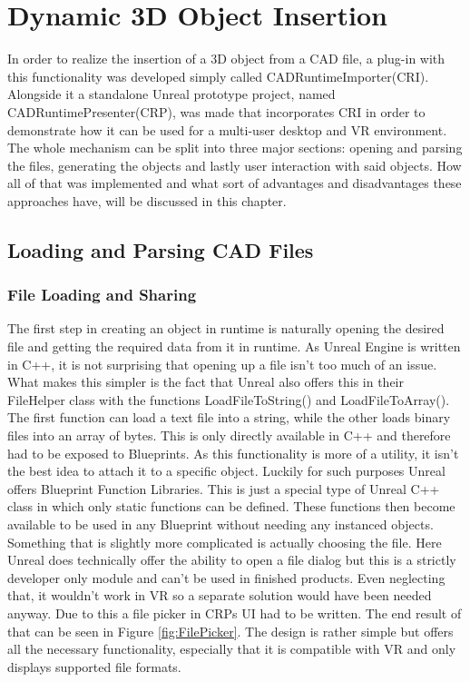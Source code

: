 \chapter{Dynamic 3D Object Insertion}\label{chp:ObjectLoading}

In order to realize the insertion of a 3D object from a CAD file, a plug-in with this functionality was developed simply called CADRuntimeImporter(CRI). Alongside it a standalone Unreal prototype project, named CADRuntimePresenter(CRP), was made that incorporates CRI in order to demonstrate how it can be used for a multi-user desktop and VR environment. The whole mechanism can be split into three major sections: opening and parsing the files, generating the objects and lastly user interaction with said objects. How all of that was implemented and what sort of advantages and disadvantages these approaches have, will be discussed in this chapter.
\section{Loading and Parsing CAD Files}
\subsection{File Loading and Sharing}
The first step in creating an object in runtime is naturally opening the desired file and getting the required data from it in runtime. As Unreal Engine is written in C++, it is not surprising that opening up a file isn't too much of an issue. What makes this simpler is the fact that Unreal also offers this in their FileHelper class with the functions LoadFileToString() and LoadFileToArray(). The first function can load a text file into a string, while the other loads binary files into an array of bytes. This is only directly available in C++ and therefore had to be exposed to Blueprints. As this functionality is more of a utility, it isn't the best idea to attach it to a specific object. Luckily for such purposes Unreal offers Blueprint Function Libraries. This is just a special type of Unreal C++ class in which only static functions can be defined. These functions then become available to be used in any Blueprint without needing any instanced objects.\\

Something that is slightly more complicated is actually choosing the file. Here Unreal does technically offer the ability to open a file dialog but this is a strictly developer only module and can't be used in finished products. Even neglecting that, it wouldn't work in VR so a separate solution would have been needed anyway. Due to this a file picker in CRPs UI had to be written. The end result of that can be seen in Figure \ref{fig:FilePicker}. The design is rather simple but offers all the necessary functionality, especially that it is compatible with VR and only displays supported file formats.\\


